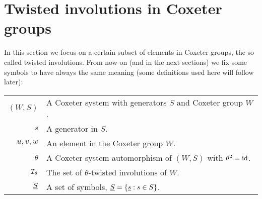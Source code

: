 \chapter[Twisted involutions]{Twisted involutions in Coxeter groups}
\label{sec:twisted-involutions}

In this section we focus on a certain subset of elements in Coxeter groups, the so called twisted involutions. From now on (and in the next sections) we fix some symbols to have always the same meaning (some definitions used here will follow later):

\vspace*{1em}

\begin{tabular}{rl}
	$(W,S)$			& A Coxeter system with generators $S$ and Coxeter group $W$.\\
	$s$				& A generator in $S$.\\
	$u,v,w$			& An element in the Coxeter group $W$.\\
	$\theta$		& A Coxeter system automorphism of $(W,S)$ with $\theta^2 = \operatorname{id}$.\\
	$\mathcal{I}_{\theta}$	& The set of $\theta$-twisted involutions of $W$.\\
	$\underline{S}$			& A set of symbols, $\underline{S} = \{ \underline{s} : s \in S \}$.\\
\end{tabular}





